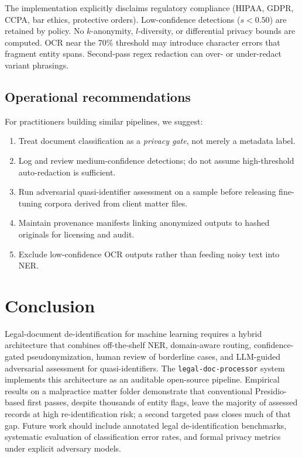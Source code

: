 \documentclass[11pt,a4paper]{article}
\begin{document}
The implementation explicitly disclaims regulatory compliance (HIPAA, GDPR, CCPA, bar ethics, protective orders). Low-confidence detections ($s < 0.50$) are retained by policy. No $k$-anonymity, $l$-diversity, or differential privacy bounds are computed. OCR near the 70\% threshold may introduce character errors that fragment entity spans. Second-pass regex redaction can over- or under-redact variant phrasings.

\subsection{Operational recommendations}

For practitioners building similar pipelines, we suggest:
\begin{enumerate}[noitemsep]
  \item Treat document classification as a \emph{privacy gate}, not merely a metadata label.
  \item Log and review medium-confidence detections; do not assume high-threshold auto-redaction is sufficient.
  \item Run adversarial quasi-identifier assessment on a sample before releasing fine-tuning corpora derived from client matter files.
  \item Maintain provenance manifests linking anonymized outputs to hashed originals for licensing and audit.
  \item Exclude low-confidence OCR outputs rather than feeding noisy text into NER.
\end{enumerate}

\section{Conclusion}

Legal-document de-identification for machine learning requires a hybrid architecture that combines off-the-shelf NER, domain-aware routing, confidence-gated pseudonymization, human review of borderline cases, and LLM-guided adversarial assessment for quasi-identifiers. The \texttt{legal-doc-processor} system implements this architecture as an auditable open-source pipeline. Empirical results on a malpractice matter folder demonstrate that conventional Presidio-based first passes, despite thousands of entity flags, leave the majority of assessed records at high re-identification risk; a second targeted pass closes much of that gap. Future work should include annotated legal de-identification benchmarks, systematic evaluation of classification error rates, and formal privacy metrics under explicit adversary models.
\end{document}
